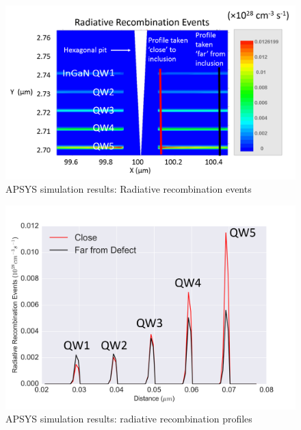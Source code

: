 \begin{figure}[h]
	\centering
	\includegraphics[width=1\textwidth]{Figs/Ch3/deep_big1.png}
	\caption[h] {APSYS simulation results: Radiative recombination events}
	\label{deep_big1}
\end{figure}
\FloatBarrier 

\begin{figure}[h]
	\centering
	\includegraphics[width=1\textwidth]{Figs/Ch3/5A_rad.png}
	\caption[h] {APSYS simulation results: radiative recombination profiles}
	\label{deep_big1-rad}
\end{figure}
\FloatBarrier


